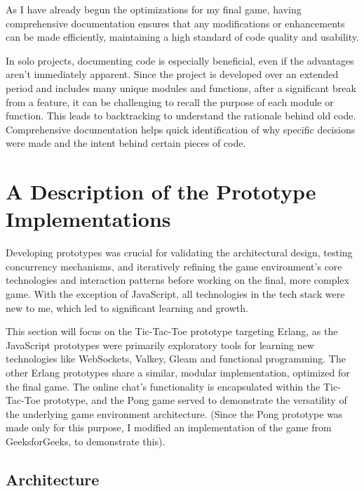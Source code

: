 \documentclass[]{final}
\begin{document}
As I have already begun the
optimizations for my final game, having comprehensive documentation
ensures that any modifications or enhancements can be made efficiently,
maintaining a high standard of code quality and usability.

In solo projects, documenting code is especially beneficial, even if the advantages
aren't immediately apparent. Since the project is developed over an extended period
and includes many unique modules and functions, after a significant break from a
feature, it can be challenging to recall the purpose of each module or function.
This leads to backtracking to understand the rationale behind old code.
Comprehensive documentation helps quick identification of why specific decisions
were made and the intent behind certain pieces of code.


\chapter{A Description of the Prototype Implementations}

Developing prototypes was crucial for validating the architectural design,
testing concurrency mechanisms, and iteratively refining the game environment's
core technologies and interaction patterns before working on the final,
more complex game. With the exception of JavaScript,
all technologies in the tech stack were new to me, which led to
significant learning and growth.

This section will focus on the Tic-Tac-Toe prototype targeting Erlang,
as the JavaScript prototypes were primarily exploratory tools for learning
new technologies like WebSockets, Valkey, Gleam and functional programming.
The other Erlang prototypes share a similar, modular implementation,
optimized for the final game. The online chat's functionality is
encapsulated within the Tic-Tac-Toe prototype, and the Pong game
served to demonstrate the versatility of the underlying game
environment architecture. (Since the Pong prototype was made only for this purpose,
I modified an implementation of the game from GeeksforGeeks, to demonstrate this).\cite{GeeksforGeeks_pong_2021}

\section{Architecture}
\end{document}
